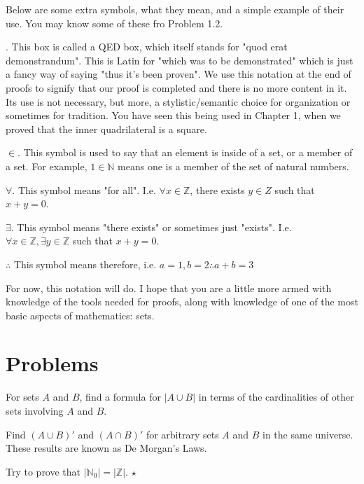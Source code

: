 Below are some extra symbols, what they mean, and a simple example of their use. You may know some of these fro Problem 1.2.

\qedsymbol . This box is called a QED box, which itself stands for "quod erat demonstrandum". This is Latin for "which was to be demonstrated" which is just a fancy way of saying "thus it's been proven". We use this notation at the end of proofs to signify that our proof is completed and there is no more content in it. Its use is not necessary, but more, a stylistic/semantic choice for organization or sometimes for tradition. You have seen this being used in Chapter 1, when we proved that the inner quadrilateral is a square.

$\in$. This symbol is used to say that an element is inside of a set, or a member of a set. For example, $1 \in \mathbb{N}$ means one is a member of the set of natural numbers. 

$\forall$. This symbol means "for all". I.e. $\forall x \in \mathbb{Z}$, there exists $y \in {Z}$ such that $x + y = 0$. 

$\exists$. This symbol means "there exists" or sometimes just "exists". I.e. $\forall x \in \mathbb{Z}, \exists y \in \mathbb{Z}$ such that $x + y = 0$. 

$\therefore$ This symbol means therefore, i.e. $a = 1, b = 2 \therefore a+b = 3$

For now, this notation will do. I hope that you are a little more armed with knowledge of the tools needed for proofs, along with knowledge of one of the most basic aspects of mathematics: sets.

\section{Problems}

\begin{problem}
    For sets $A$ and $B$, find a formula for $|A \cup B|$ in terms of the cardinalities of other sets involving $A$ and $B$.
\end{problem}

\begin{problem}
Find $(A \cup B)'$ and $(A \cap B)'$ for arbitrary sets $A$ and $B$ in the same universe. These results are known as De Morgan's Laws. 
\end{problem}

\begin{problem}
   Try to prove that $|\mathbb{N}_0| = |\mathbb{Z}|$. \hfill $\star$
\end{problem}

